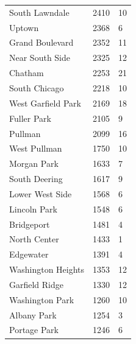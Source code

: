 \documentclass{article}
\begin{document}
\begin{table}[h!]
\begin{tabular}{|l|l|l|}
South Lawndale         & 2410             & 10               \\
Uptown                 & 2368             & 6                \\
Grand Boulevard        & 2352             & 11               \\
Near South Side        & 2325             & 12               \\
Chatham                & 2253             & 21               \\
South Chicago          & 2218             & 10               \\
West Garfield Park     & 2169             & 18               \\
Fuller Park            & 2105             & 9                \\
Pullman                & 2099             & 16               \\
West Pullman           & 1750             & 10               \\
Morgan Park            & 1633             & 7                \\
South Deering          & 1617             & 9                \\
Lower West Side        & 1568             & 6                \\
Lincoln Park           & 1548             & 6                \\
Bridgeport             & 1481             & 4                \\
North Center           & 1433             & 1                \\
Edgewater              & 1391             & 4                \\
Washington Heights     & 1353             & 12               \\
Garfield Ridge         & 1330             & 12               \\
Washington Park        & 1260             & 10               \\
Albany Park            & 1254             & 3                \\
Portage Park           & 1246             & 6                \\
\hline
\end{tabular}
\end{table}
\end{document}
